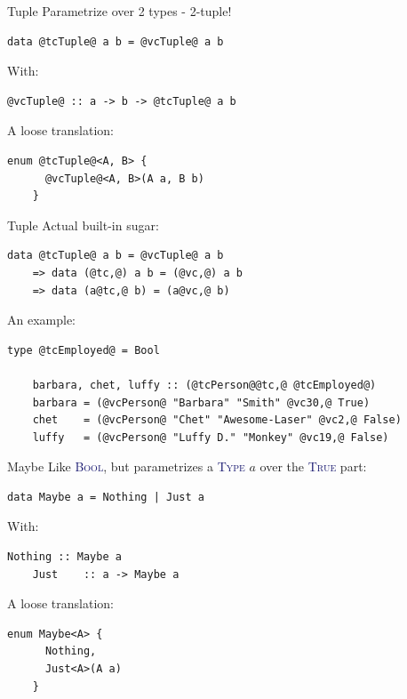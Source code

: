 \documentclass[xcolor={usenames,dvipsnames}]{beamer}
\newcommand{\htycon}[1]{\textcolor{MidnightBlue}{\textsc{#1}}}
\begin{document}
\begin{frame}[fragile]{Tuple}
  Parametrize over 2 types - 2-tuple!
  \begin{lstlisting}[style=hask]
    data @tcTuple@ a b = @vcTuple@ a b
  \end{lstlisting}

  With:
  \begin{lstlisting}[style=hask]
    @vcTuple@ :: a -> b -> @tcTuple@ a b
  \end{lstlisting}

  A loose translation:
  \begin{lstlisting}[style=hask]
    enum @tcTuple@<A, B> {
      @vcTuple@<A, B>(A a, B b)
    }
  \end{lstlisting}
\end{frame}

\begin{frame}[fragile]{Tuple}
  Actual built-in sugar:
  \begin{lstlisting}[style=hask]
       data @tcTuple@ a b = @vcTuple@ a b
    => data (@tc,@) a b = (@vc,@) a b
    => data (a@tc,@ b) = (a@vc,@ b)
  \end{lstlisting}

  An example:
  \begin{lstlisting}[style=hask]
    type @tcEmployed@ = Bool

    barbara, chet, luffy :: (@tcPerson@@tc,@ @tcEmployed@)
    barbara = (@vcPerson@ "Barbara" "Smith" @vc30,@ True)
    chet    = (@vcPerson@ "Chet" "Awesome-Laser" @vc2,@ False)
    luffy   = (@vcPerson@ "Luffy D." "Monkey" @vc19,@ False)
  \end{lstlisting}
\end{frame}

\begin{frame}[fragile]{Maybe}
  Like \htycon{Bool}, but parametrizes a \htycon{Type} $a$ over the \htycon{True} part:
  \begin{lstlisting}[style=hask]
    data Maybe a = Nothing | Just a
  \end{lstlisting}

  With:
  \begin{lstlisting}[style=hask]
    Nothing :: Maybe a
    Just    :: a -> Maybe a
  \end{lstlisting}

  A loose translation:
  \begin{lstlisting}[style=hask]
    enum Maybe<A> {
      Nothing,
      Just<A>(A a)
    }
  \end{lstlisting}
\end{frame}
\end{document}
